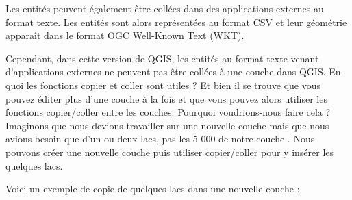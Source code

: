 \begin{itemize}
Les entités peuvent également être collées dans des applications externes au format texte. Les entités sont alors représentées au format CSV et leur géométrie apparaît dans le format OGC Well-Known Text (WKT).

Cependant, dans cette version de QGIS, les entités au format texte venant d'applications externes ne peuvent pas être collées à une couche dans QGIS. En quoi les fonctions copier et coller sont utiles ? Et bien il se trouve que vous pouvez éditer plus d'une couche à la fois et que vous pouvez alors utiliser les fonctions copier/coller entre les couches. Pourquoi voudrions-nous faire cela ? Imaginons que nous devions travailler sur une nouvelle couche mais que nous avions besoin que d'un ou deux lacs, pas les 5 000 de notre couche . Nous pouvons créer une nouvelle couche puis utiliser copier/coller pour y insérer les quelques lacs.

Voici un exemple de copie de quelques lacs dans une nouvelle couche :


\end{itemize}
